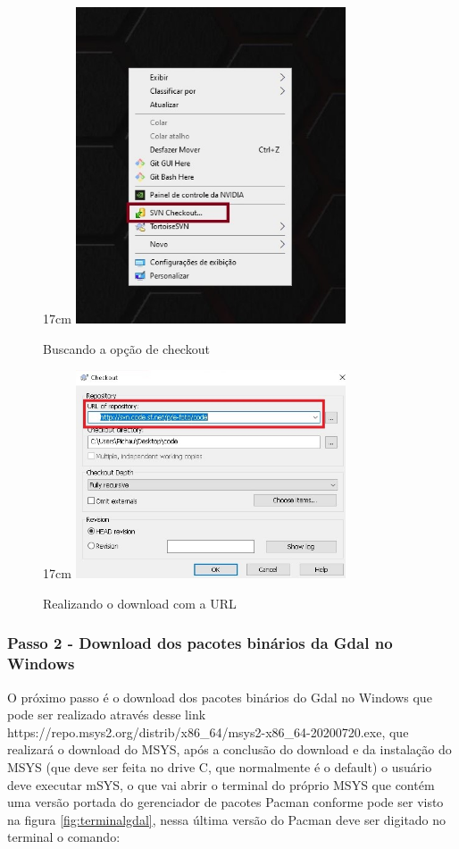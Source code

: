 \begin{figure}[!ht]{17cm}
	\centering
	\includegraphics[width=8cm]{Figuras/checkout.jpg}
	\caption{Buscando a opção de checkout} \label{fig:checkout}
\end{figure}

\begin{figure}[!ht]{17cm}
	\centering
	\includegraphics[width=8cm]{Figuras/url.jpg}
	\caption{Realizando o download com a URL} \label{fig:url}
\end{figure}
 
\subsubsection{Passo 2 - Download dos pacotes binários da Gdal no Windows} 
 O próximo passo é o download dos pacotes binários do Gdal no Windows que pode ser realizado através desse link https://repo.msys2.org/distrib/x86\_64/msys2-x86\_64-20200720.exe, que realizará o download do MSYS, após a conclusão do download e da instalação do MSYS (que deve ser feita no drive C, que normalmente é o default) o usuário deve executar mSYS, o que vai abrir o terminal do próprio MSYS que contém uma versão portada do gerenciador de pacotes Pacman conforme pode ser visto na figura \ref{fig:terminalgdal}, nessa última versão do Pacman deve ser digitado no terminal o comando:
 
